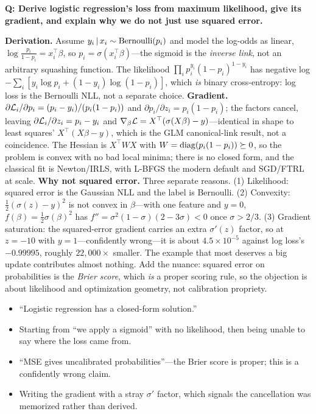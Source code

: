 \begin{interviewq}
\textbf{Q: Derive logistic regression's loss from maximum likelihood, give its gradient, and explain why we do not just use squared error.}

 \quad {} \quad \badgefreq{\freqhigh}

\stronganswer

\textbf{Derivation.} Assume $y_i\,|\, x_i \sim \mathrm{Bernoulli}(p_i)$ and model the log-odds as linear, $\log\frac{p_i}{1-p_i}=x_i^{\top}\beta$, so $p_i=\sigma(x_i^{\top}\beta)$---the sigmoid is the \emph{inverse link}, not an arbitrary squashing function. The likelihood $\prod_i p_i^{y_i}(1-p_i)^{1-y_i}$ has negative log $-\sum_i[y_i\log p_i + (1-y_i)\log(1-p_i)]$, which \emph{is} binary cross-entropy: log loss is the Bernoulli NLL, not a separate choice. \textbf{Gradient.} $\partial\mathcal{L}_i/\partial p_i = (p_i-y_i)/(p_i(1-p_i))$ and $\partial p_i/\partial z_i = p_i(1-p_i)$; the factors cancel, leaving $\partial\mathcal{L}_i/\partial z_i = p_i - y_i$ and $\nabla_\beta\mathcal{L} = X^{\top}(\sigma(X\beta)-y)$---identical in shape to least squares' $X^{\top}(X\beta - y)$, which is the GLM canonical-link result, not a coincidence. The Hessian is $X^{\top}WX$ with $W=\operatorname{diag}(p_i(1-p_i))\succeq 0$, so the problem is convex with no bad local minima; there is no closed form, and the classical fit is Newton/IRLS, with L-BFGS the modern default and SGD/FTRL at scale. \textbf{Why not squared error.} Three separate reasons. (1) Likelihood: squared error is the Gaussian NLL and the label is Bernoulli. (2) Convexity: $\tfrac12(\sigma(z)-y)^2$ is not convex in $\beta$---with one feature and $y=0$, $f(\beta)=\tfrac12\sigma(\beta)^2$ has $f''=\sigma^2(1-\sigma)(2-3\sigma)<0$ once $\sigma>2/3$. (3) Gradient saturation: the squared-error gradient carries an extra $\sigma'(z)$ factor, so at $z=-10$ with $y=1$---confidently wrong---it is about $4.5\times10^{-5}$ against log loss's $-0.99995$, roughly $22{,}000\times$ smaller. The example that most deserves a big update contributes almost nothing. Add the nuance: squared error on probabilities is the \emph{Brier score}, which \emph{is} a proper scoring rule, so the objection is about likelihood and optimization geometry, not calibration propriety.

\redflags
\begin{itemize}
    \item ``Logistic regression has a closed-form solution.''
    \item Starting from ``we apply a sigmoid'' with no likelihood, then being unable to say where the loss came from.
    \item ``MSE gives uncalibrated probabilities''---the Brier score is proper; this is a confidently wrong claim.
    \item Writing the gradient with a stray $\sigma'$ factor, which signals the cancellation was memorized rather than derived.
\end{itemize}


\end{interviewq}
